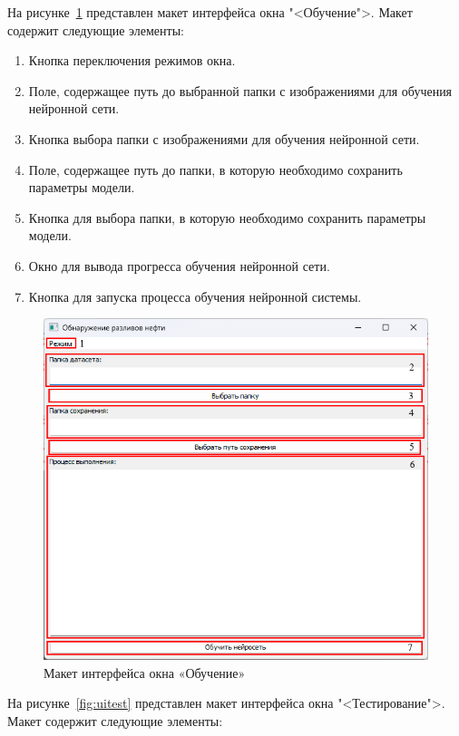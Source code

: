На рисунке~\ref{fig:uitrain} представлен макет интерфейса окна "<Обучение">. Макет содержит следующие элементы:

\begin{enumerate}
	\item Кнопка переключения режимов окна.
	\item Поле, содержащее путь до выбранной папки с изображениями для обучения нейронной сети.
	\item Кнопка выбора папки с изображениями для обучения нейронной сети.
	\item Поле, содержащее путь до папки, в которую необходимо сохранить параметры модели.
	\item Кнопка для выбора папки, в которую необходимо сохранить параметры модели.
	\item Окно для вывода прогресса обучения нейронной сети.
	\item Кнопка для запуска процесса обучения нейронной системы.
\end{enumerate}

\begin{figure}[H]
	\centering
	\includegraphics[width=1\linewidth]{images/ui_train}
	\caption{Макет интерфейса окна «Обучение»}
	\label{fig:uitrain}
\end{figure}

На рисунке~\ref{fig:uitest} представлен макет интерфейса окна "<Тестирование">. Макет содержит следующие элементы:

